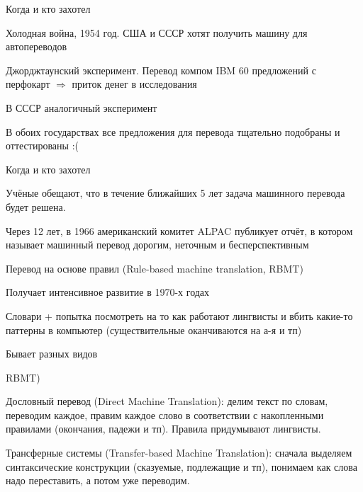 \documentclass[notes,12pt, aspectratio=169]{beamer}
\newenvironment{wideitemize}{\itemize\addtolength{\itemsep}{10pt}}{\enditemize}
\begin{document}
\begin{frame} {Когда и кто захотел} 
\begin{wideitemize}
	\item   Холодная война, 1954 год. США и СССР хотят получить машину для автопереводов 
	\item   Джорджтаунский эксперимент. Перевод компом IBM 60 предложений с перфокарт $\Rightarrow$ приток денег в исследования
	\item  В СССР аналогичный эксперимент 
	\item  В обоих государствах все предложения для перевода тщательно подобраны и оттестированы :(
\end{wideitemize}
\end{frame}

\begin{frame} {Когда и кто захотел} 
\begin{wideitemize}
	\item   Учёные обещают, что в течение ближайших 5 лет задача машинного перевода будет решена. 
	\item Через 12 лет, в 1966 американский комитет ALPAC публикует отчёт, в котором называет машинный перевод дорогим, неточным и бесперспективным
\end{wideitemize}
\end{frame}

\begin{frame} {Перевод на основе правил (Rule-based machine translation, RBMT)} 
\begin{wideitemize}
	\item  Получает интенсивное развитие в 1970-х годах
	\item  Словари + попытка посмотреть на то как работают лингвисты и вбить какие-то паттерны в компьютер (существительные оканчиваются на а-я и тп) 
	\item  Бывает разных видов 
\end{wideitemize}
\end{frame}

\begin{frame} {RBMT)} 
\begin{wideitemize}
	\item  \alert{Дословный перевод (Direct Machine Translation):} делим текст по словам, переводим каждое, правим каждое слово в соответствии с накопленными правилами  (окончания, падежи и тп). Правила придумывают лингвисты.
	\item  \alert{Трансферные системы (Transfer-based Machine Translation):} сначала выделяем синтаксические конструкции (сказуемые, подлежащие и тп), понимаем как слова надо переставить, а потом уже переводим.
\end{wideitemize}
\end{frame}
\end{document}
